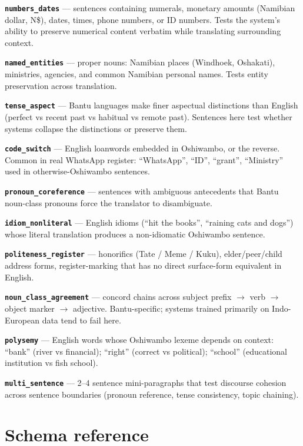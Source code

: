 \documentclass[11pt]{article}
\begin{document}
\textbf{\texttt{numbers\_dates}} --- sentences containing numerals,
monetary amounts (Namibian dollar, N\$), dates, times, phone
numbers, or ID numbers. Tests the system's ability to preserve
numerical content verbatim while translating surrounding context.

\textbf{\texttt{named\_entities}} --- proper nouns: Namibian places
(Windhoek, Oshakati), ministries, agencies, and common Namibian
personal names. Tests entity preservation across translation.

\textbf{\texttt{tense\_aspect}} --- Bantu languages make finer
aspectual distinctions than English (perfect vs recent past vs
habitual vs remote past). Sentences here test whether systems
collapse the distinctions or preserve them.

\textbf{\texttt{code\_switch}} --- English loanwords embedded in
Oshiwambo, or the reverse. Common in real WhatsApp register:
``WhatsApp'', ``ID'', ``grant'', ``Ministry'' used in
otherwise-Oshiwambo sentences.

\textbf{\texttt{pronoun\_coreference}} --- sentences with
ambiguous antecedents that Bantu noun-class pronouns force the
translator to disambiguate.

\textbf{\texttt{idiom\_nonliteral}} --- English idioms (``hit the
books'', ``raining cats and dogs'') whose literal translation
produces a non-idiomatic Oshiwambo sentence.

\textbf{\texttt{politeness\_register}} --- honorifics (Tate / Meme
/ Kuku), elder/peer/child address forms, register-marking that has
no direct surface-form equivalent in English.

\textbf{\texttt{noun\_class\_agreement}} --- concord chains across
subject prefix $\rightarrow$ verb $\rightarrow$ object marker
$\rightarrow$ adjective. Bantu-specific; systems trained primarily
on Indo-European data tend to fail here.

\textbf{\texttt{polysemy}} --- English words whose Oshiwambo lexeme
depends on context: ``bank'' (river vs financial); ``right''
(correct vs political); ``school'' (educational institution vs fish
school).

\textbf{\texttt{multi\_sentence}} --- 2--4 sentence mini-paragraphs
that test discourse cohesion across sentence boundaries (pronoun
reference, tense consistency, topic chaining).

\section{Schema reference}
\label{appendix:schema}
\end{document}
